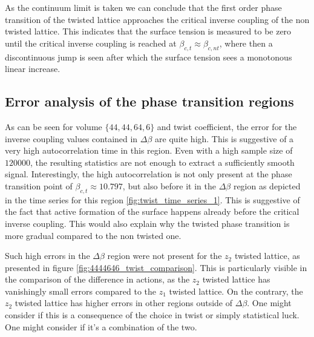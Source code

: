 \documentclass[english,twoside,openright]{UH_TCM_MSc}
\begin{document}
As the continuum limit is taken we can conclude that the first order phase transition of the twisted lattice approaches the critical inverse coupling of the non twisted lattice. This indicates that the surface tension is measured to be zero until the critical inverse coupling is reached at $\beta_{c,t} \approx \beta_{c,nt}$, where then a discontinuous jump is seen after which the surface tension sees a monotonous linear increase.

\subsection{Error analysis of the phase transition regions}

As can be seen for volume $\{44,44,64,6\}$ and twist coefficient, the error for the inverse coupling values contained in $\Delta \beta$ are quite high. This is suggestive of a very high autocorrelation time in this region. Even with a high sample size of $120000$, the resulting statistics are not enough to extract a sufficiently smooth signal. Interestingly, the high autocorrelation is not only present at the phase transition point of $\beta_{c,t} \approx 10.797$, but also before it in the $\Delta \beta$ region as depicted in the time series for this region \ref{fig:twist_time_series_1}. This is suggestive of the fact that active formation of the surface happens already before the critical inverse coupling. This would also explain why the twisted phase transition is more gradual compared to the non twisted one. 

Such high errors in the $\Delta \beta$ region were not present for the $z_2$ twisted lattice, as presented in figure \ref{fig:4444646_twist_comparison}. This is particularly visible in the comparison of the difference in actions, as the $z_2$ twisted lattice has vanishingly small errors compared to the $z_1$ twisted lattice. On the contrary, the $z_2$ twisted lattice has higher errors in other regions outside of $\Delta \beta$. One might consider if this is a consequence of the choice in twist or simply statistical luck. One might consider if it's a combination of the two. 
\end{document}
